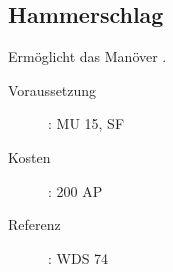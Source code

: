 \subsection{Hammerschlag}
\label{sf.hammerschlag}
Ermöglicht das Manöver .
\begin{description}
    \item[Voraussetzung]:
        MU 15, SF 
    \item [Kosten]:
        200 AP
    \item [Referenz]:
        WDS 74
\end{description}
